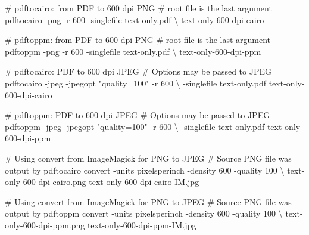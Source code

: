 \documentclass[
  12pt,
  british,
  a4paper,
  rgb,
  dvipsnames,
  svgnames,
  hyphens]{article}
\newenvironment{Shaded}{\begin{snugshade}}{\end{snugshade}}
\newcommand{\AttributeTok}[1]{\textcolor[rgb]{0.80,0.80,0.80}{#1}}
\newcommand{\CommentTok}[1]{\textcolor[rgb]{0.50,0.62,0.50}{#1}}
\newcommand{\DataTypeTok}[1]{\textcolor[rgb]{0.87,0.87,0.75}{#1}}
\newcommand{\ExtensionTok}[1]{\textcolor[rgb]{0.80,0.80,0.80}{#1}}
\newcommand{\NormalTok}[1]{\textcolor[rgb]{0.80,0.80,0.80}{#1}}
\newcommand{\StringTok}[1]{\textcolor[rgb]{0.80,0.58,0.58}{#1}}
\begin{document}
\begin{Shaded}
\begin{Highlighting}[]
\CommentTok{\# \textasciigrave{}pdftocairo\textasciigrave{}: from PDF to 600 dpi PNG}
\CommentTok{\# root file is the last argument}
\ExtensionTok{pdftocairo} \AttributeTok{{-}png} \AttributeTok{{-}r}\NormalTok{ 600 }\AttributeTok{{-}singlefile}\NormalTok{ text{-}only.pdf }\DataTypeTok{\textbackslash{}}
\NormalTok{text{-}only{-}600{-}dpi{-}cairo}

\CommentTok{\# \textasciigrave{}pdftoppm\textasciigrave{}: from PDF to 600 dpi PNG}
\CommentTok{\# root file is the last argument}
\ExtensionTok{pdftoppm} \AttributeTok{{-}png} \AttributeTok{{-}r}\NormalTok{ 600 }\AttributeTok{{-}singlefile}\NormalTok{ text{-}only.pdf }\DataTypeTok{\textbackslash{}}
\NormalTok{text{-}only{-}600{-}dpi{-}ppm}

\CommentTok{\# \textasciigrave{}pdftocairo\textasciigrave{}: PDF to 600 dpi JPEG}
\CommentTok{\# Options may be passed to JPEG}
\ExtensionTok{pdftocairo} \AttributeTok{{-}jpeg} \AttributeTok{{-}jpegopt} \StringTok{"quality=100"} \AttributeTok{{-}r}\NormalTok{ 600 }\DataTypeTok{\textbackslash{}}
\NormalTok{{-}singlefile text{-}only.pdf text{-}only{-}600{-}dpi{-}cairo}

\CommentTok{\# \textasciigrave{}pdftoppm\textasciigrave{}: PDF to 600 dpi JPEG}
\CommentTok{\# Options may be passed to JPEG}
\ExtensionTok{pdftoppm} \AttributeTok{{-}jpeg} \AttributeTok{{-}jpegopt} \StringTok{"quality=100"} \AttributeTok{{-}r}\NormalTok{ 600 }\DataTypeTok{\textbackslash{}}
\NormalTok{{-}singlefile text{-}only.pdf text{-}only{-}600{-}dpi{-}ppm}

\CommentTok{\# Using \textasciigrave{}convert\textasciigrave{} from ImageMagick for PNG to JPEG}
\CommentTok{\# Source PNG file was output by \textasciigrave{}pdftocairo\textasciigrave{}}
\ExtensionTok{convert} \AttributeTok{{-}units}\NormalTok{ pixelsperinch }\AttributeTok{{-}density}\NormalTok{ 600 }\AttributeTok{{-}quality}\NormalTok{ 100 }\DataTypeTok{\textbackslash{}}
\NormalTok{text{-}only{-}600{-}dpi{-}cairo.png text{-}only{-}600{-}dpi{-}cairo{-}IM.jpg}

\CommentTok{\# Using \textasciigrave{}convert\textasciigrave{} from ImageMagick for PNG to JPEG}
\CommentTok{\# Source PNG file was output by \textasciigrave{}pdftoppm\textasciigrave{}}
\ExtensionTok{convert} \AttributeTok{{-}units}\NormalTok{ pixelsperinch }\AttributeTok{{-}density}\NormalTok{ 600 }\AttributeTok{{-}quality}\NormalTok{ 100 }\DataTypeTok{\textbackslash{}}
\NormalTok{text{-}only{-}600{-}dpi{-}ppm.png text{-}only{-}600{-}dpi{-}ppm{-}IM.jpg}
\end{Highlighting}
\end{Shaded}
\end{document}
